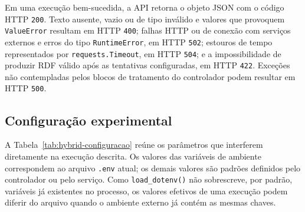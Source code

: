 Em uma execução bem-sucedida, a API retorna o objeto JSON com o código HTTP
\texttt{200}. Texto ausente, vazio ou de tipo inválido e valores que provoquem
\texttt{ValueError} resultam em HTTP \texttt{400}; falhas HTTP ou de conexão com
serviços externos e erros do tipo \texttt{RuntimeError}, em HTTP \texttt{502};
estouros de tempo representados por \texttt{requests.Timeout}, em HTTP
\texttt{504}; e a impossibilidade de produzir RDF válido após as tentativas
configuradas, em HTTP \texttt{422}. Exceções não contempladas pelos blocos de
tratamento do controlador podem resultar em HTTP \texttt{500}.

\subsection{Configuração experimental}
\label{subsec:hybrid-configuracao}

A Tabela~\ref{tab:hybrid-configuracao} reúne os parâmetros que interferem
diretamente na execução descrita. Os valores das variáveis de ambiente
correspondem ao arquivo \texttt{.env} atual; os demais valores são padrões
definidos pelo controlador ou pelo serviço. Como \texttt{load\_dotenv()} não
sobrescreve, por padrão, variáveis já existentes no processo, os valores
efetivos de uma execução podem diferir do arquivo quando o ambiente externo já
contém as mesmas chaves.


